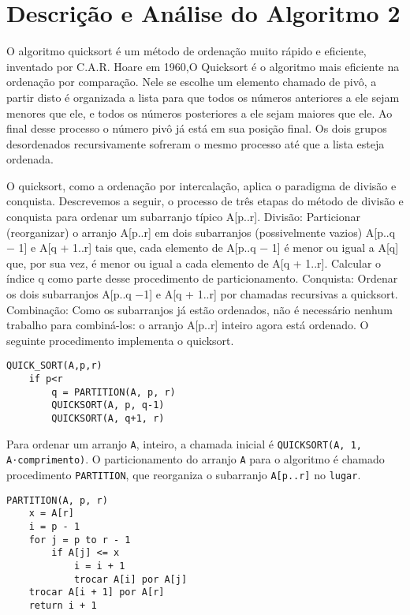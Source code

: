 \documentclass{article}
\begin{document}
\section{Descrição e Análise do Algoritmo 2}

O algoritmo quicksort é um método de ordenação muito rápido e eficiente, inventado por C.A.R. Hoare em 1960,O Quicksort é o algoritmo mais eficiente na ordenação por comparação. Nele se escolhe um elemento chamado de pivô, a partir disto é organizada a lista para que todos os números anteriores a ele sejam menores que ele, e todos os números posteriores a ele sejam maiores que ele. Ao final desse processo o número pivô já está em sua posição final. Os dois grupos desordenados recursivamente sofreram o mesmo processo até que a lista esteja ordenada.

O quicksort, como a ordenação por intercalação, aplica o paradigma de divisão e conquista. Descrevemos a seguir, o processo de três etapas do método de divisão e conquista para ordenar um subarranjo típico A[p..r]. Divisão: Particionar (reorganizar) o arranjo A[p..r] em dois subarranjos (possivelmente vazios) A[p..q − 1] e A[q + 1..r] tais que, cada elemento de A[p..q − 1] é menor ou igual a A[q] que, por sua vez, é menor ou igual a cada elemento de A[q + 1..r]. Calcular o índice q como parte desse procedimento de particionamento. Conquista: Ordenar os dois subarranjos A[p..q −1] e A[q + 1..r] por chamadas recursivas a quicksort. Combinação: Como os subarranjos já estão ordenados, não é necessário nenhum trabalho para combiná-los: o arranjo A[p..r] inteiro agora está ordenado. O seguinte procedimento implementa o quicksort.

\begin{verbatim}
QUICK_SORT(A,p,r)
    if p<r
        q = PARTITION(A, p, r)
        QUICKSORT(A, p, q-1)
        QUICKSORT(A, q+1, r)
\end{verbatim}

Para ordenar um arranjo \texttt{A}, inteiro, a chamada inicial é \texttt{QUICKSORT(A, 1, A⋅comprimento)}.
O particionamento do arranjo \texttt{A} para o algoritmo é chamado procedimento \texttt{PARTITION}, que reorganiza o subarranjo \texttt{A[p..r]} no \texttt{lugar}.

\begin{verbatim}
PARTITION(A, p, r)
    x = A[r]
    i = p - 1
    for j = p to r - 1
        if A[j] <= x
            i = i + 1
            trocar A[i] por A[j]
    trocar A[i + 1] por A[r]
    return i + 1
\end{verbatim}
\end{document}
